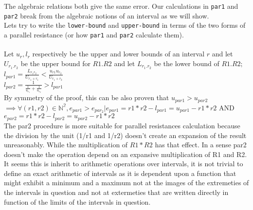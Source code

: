\documentclass{article}
\begin{document}
\noindent The algebraic relations both give the same error. Our calculations in \texttt{par1} and \texttt{par2} break from the algebraic notions  of an interval as we will show.\\
Lets try to write the \texttt{lower-bound} and \texttt{upper-bound} in terms of the two forms of a parallel resistance (or how \texttt{par1} and \texttt{par2} calculate them).\\ \\
Let $u_{r} , l_{r}$ respectively be the upper and lower bounds of an interval $r$ and let $U_{r_1.r_2}$  be the upper bound for $R1.R2$ and let $L_{r_1.r_2}$ be the lower bound of $R1 . R2;$\\
\noindent$l_{par1} =  \frac{L_{r_1r_2}}{U_{r_1+ r_1}} < \frac{u_{r1}u_{r_2}}{U_{r_1+r_2}} $\\
\noindent$ l_{par2} = \frac{1}{\frac{1}{u_{r_1}} + \frac{1}{u_{r_2}}} > l_{par1} $\\
By symmetry of the proof, this can be also proven that $u_{par1} > u_{par2}$\\
$\implies \forall (r1,r2) \in \mathbb{N^2}, e_{par1} > e_{par_2} | e_{par1} = r1*r2 - l_{par1} = u_{par1} - r1*r2 $ AND $ e_{par2} = r1*r2 - l_{par2} = u_{par2} - r1*r2 $\\
\noindent The par2 procedure is more suitable for parallel resistances calculation because the division by the unit (1/r1 and 1/r2) doesn't create an expansion of the result unreasonably. While the multiplication of $R1*R2$ has that effect. In a sense par2 doesn't make the operation depend on an expansive multiplication of R1 and R2. It seems this is inherit to arithmetic operations over intervals, it is not trivial to define an exact arithmetic of intervals as it is dependent upon a function that might exhibit a minimum and a maximum not at the images of the extremeties of the intervals in question and not at extermeties that are written directly in function of the limits of the intervals in question.
\end{document}
